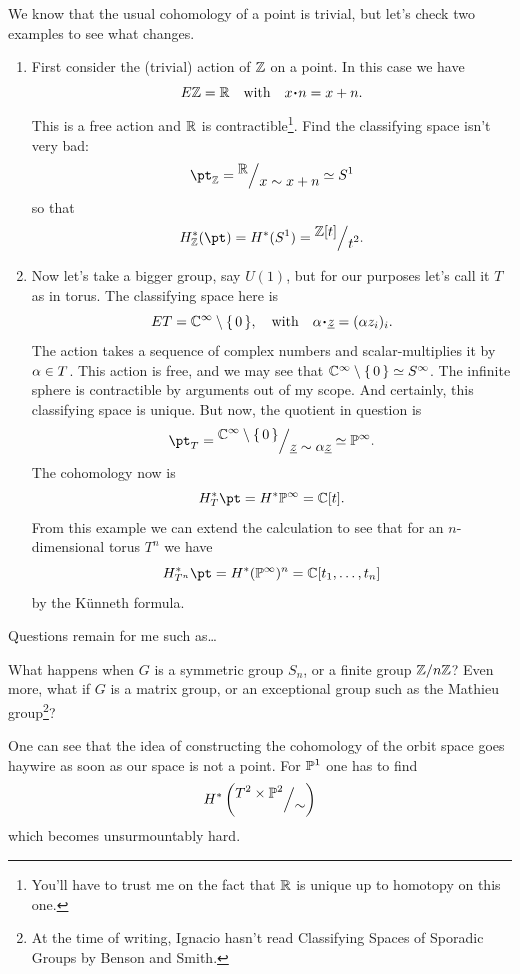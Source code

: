 \documentclass[12pt]{memoir}
\begin{document}
\begin{Ex}
We know that the usual cohomology of a point is trivial, but let's check two examples to see what changes.
\begin{enumerate}
    \item First consider the (trivial) action of $\mathbb{Z}$ on a point. In this case we have
    $$E\bZ=\bR\word{with}x\.n=x+n.$$
    This is a free action and $\mathbb{R}$ is contractible\footnote{You'll have to trust me on the fact that $\mathbb{R}$ is unique up to homotopy on this one.}. Find the classifying space isn't very bad:
    $$\pt_\bZ=\quot{\bR}{x\sim x+n}\isom S^1$$
    so that 
    $$H_\bZ^\ast(\pt)=H^\ast(S^1)=\quot{\bZ[t]}{t^2}.$$
    \item Now let's take a bigger group, say $U(1)$, but for our purposes let's call it $T$ as in torus. The classifying space here is 
    $$ET=\bC^\infty\less\set{0},\word{with}\al\.\un{z}=(\al z_i)_i.$$
    The action takes a sequence of complex numbers and scalar-multiplies it by $\alpha\in T$. 
    This action is free, and we may see that $\mathbb{C}^\infty\setminus\{\,0\,\}\simeq S^\infty$. The infinite sphere is contractible by arguments out of my scope. And certainly, this classifying space is unique. But now, the quotient in question is 
    $$\pt_T=\quot{\bC^\infty\less\set{0}}{\un{z}\sim \al\un{z}}\isom\bP^\infty.$$
    The cohomology now is 
    $$H^\ast_{T}\pt=H^\ast\bP^\infty=\bC[t].$$
    From this example we can extend the calculation to see that for an $n$-dimensional torus $T^n$ we have 
    $$H^\ast_{T^n}\pt=H^\ast(\bP^\infty)^n=\bC[t_1,\dots,t_n]$$
    by the K\"unneth formula.
\end{enumerate}
\end{Ex}

Questions remain for me such as\dots

\begin{Qn}
    What happens when $G$ is a symmetric group $S_n$, or a finite group $\mathbb{Z}/n\mathbb{Z}$? Even more, what if $G$ is a matrix group, or an exceptional group such as the Mathieu group\footnote{At the time of writing, Ignacio hasn't read Classifying Spaces of Sporadic Groups by Benson and Smith.}?  
\end{Qn}

\begin{Rmk}
    One can see that the idea of constructing the cohomology of the orbit space goes haywire as soon as our space is not a point. For $\mathbb{P}^1$ one has to find
    $$H^\ast\left(\quot{T^2\x\bP^2}{\sim}\right)$$
    which becomes unsurmountably hard.
\end{Rmk}
\end{document}
